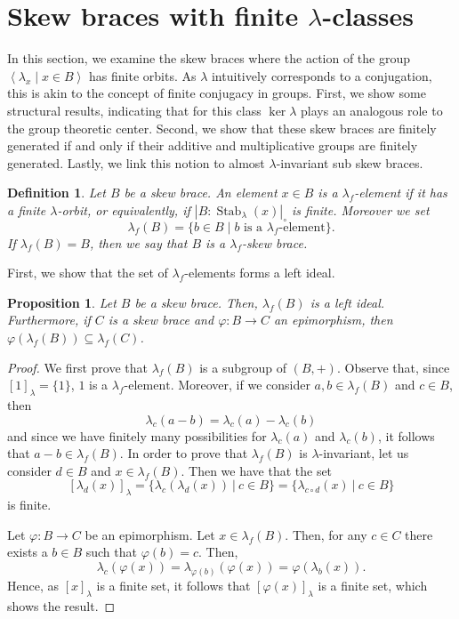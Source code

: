 \documentclass{amsart}
\newcommand{\Stab}{\operatorname{Stab}}
\newtheorem{pro}[thm]{Proposition}
\newtheorem{defn}[thm]{Definition}
\begin{document}
\section{Skew braces with finite \texorpdfstring{$\lambda$}{lambda}-classes}\label{seclambda}

In this section, we examine the skew braces where the action of the group $\left<\lambda_x\mid x \in B \right>$ has finite orbits. As $\lambda$ intuitively corresponds to a conjugation, this is akin to the concept of finite conjugacy in groups.  First, we show some structural results, indicating that for this class $\ker\lambda$ plays an analogous role to the group theoretic center. Second, we show that these skew braces are finitely generated if and only if their additive and multiplicative groups are finitely generated. Lastly, we link this notion to almost $\lambda$-invariant sub skew braces.

\begin{defn}
    Let $B$ be a skew brace. An element $x\in B$ is a \emph{$\lambda_f$-element} if it has a finite $\lambda$-orbit, or equivalently, if $|B:\Stab_\lambda(x)|_\circ$ is finite. Moreover we set
\[
\lambda_f(B)=\{b\in B\mid b \text{ is a }\lambda_f\text{-element}\}.
\]
If $\lambda_f(B)=B$, then we say that $B$ is a $\lambda_f$-skew brace.
\end{defn}

First, we show that the set of $\lambda_f$-elements forms a left ideal. 

\begin{pro}\label{sli}
   Let $B$ be a skew brace. Then, $\lambda_f(B)$ is a left ideal. Furthermore, if $C$ is a skew brace and $\varphi:B\rightarrow  C$ an epimorphism, then $\varphi(\lambda_f(B))\subseteq \lambda_f(C)$.
\end{pro}
\begin{proof}
     
We first prove that $\lambda_f(B)$ is a subgroup of $(B,+)$. Observe that, since $[1]_{\lambda}=\{1\}$, $1$ is a $\lambda_f\text{-element}$. Moreover, if we consider $a,b\in\lambda_f(B)$ and $c\in B$, then $$\lambda_c(a-b)=\lambda_c(a)-\lambda_c(b)$$ and since we have finitely many possibilities for $\lambda_c(a)$ and $\lambda_c(b)$, it follows that $a-b\in\lambda_f(B)$. In order to prove that $\lambda_f(B)$ is $\lambda$-invariant, let us consider $d\in B$ and $x\in\lambda_f(B)$. Then we have that the set $$[\lambda_d(x)]_{\lambda}=\{\lambda_c(\lambda_d(x)) \ | \ c\in B\}=\{\lambda_{c\circ d}(x) \ | \ c\in B\}$$ is finite. 

Let $\varphi:B\rightarrow C$ be an epimorphism. Let $x \in \lambda_f(B)$. Then, for any $ c \in C$ there exists a $b \in B$ such that $\varphi(b)=c$. Then,  $$ \lambda_c(\varphi(x))=\lambda_{\varphi(b)}(\varphi(x))=\varphi(\lambda_b(x)).$$ Hence, as $[x]_{\lambda}$ is a finite set, it follows that $[\varphi(x)]_{\lambda}$ is a finite set, which shows the result.
\end{proof}
\end{document}
